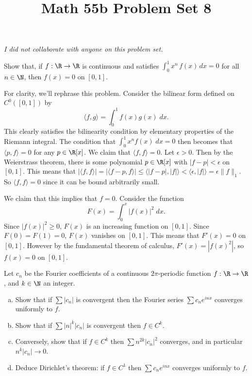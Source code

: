 \documentclass[11pt,letterpaper]{article}
\title{\textbf{Math 55b Problem Set 8}}
\begin{document}
\maketitle

\begin{center}
    \textit{I did not collaborate with anyone on this problem set.}
\end{center}
\begin{problem}
    Show that, if $f:\R\to \R$ is continuous and satisfies $\int_0^1 x^n\,f(x)\,dx=0$ for all $n\in \N$, then $f(x)=0$ on $[0,1]$. 
\end{problem}
\begin{solution}
    For clarity, we'll rephrase this problem. Consider the bilinear form defined on $C^0([0,1])$ by
    \[
        \big\langle f,g \big\rangle = \int^1_0 f(x)g(x)\;dx
    .\] 
    This clearly satisfies the bilinearity condition by elementary properties of the Riemann integral. The condition that $\int_0^1 x^nf(x)\;dx=0$ then becomes that $\big\langle p,f \big\rangle=0$ for any $p\in \R[x]$. We claim that $\big\langle f,f \big\rangle=0$. Let $\epsilon > 0$. Then by the Weierstrass theorem, there is some polynomial $p\in \R[x]$ with $|f-p|<\epsilon$ on $[0,1]$. This means that $|\big\langle f,f \big\rangle| = |\big\langle f-p, f \big\rangle| \leq \big\langle |f-p|, |f| \big\rangle < \big\langle \epsilon, |f| \big\rangle = \epsilon \|f\|_1$. So $\big\langle f,f \big\rangle=0$ since it can be bound arbitrarily small. 
    
    We claim that this implies that $f=0$. Consider the function
    \[
        F(x)=\int_0^x|f(x)|^2\;dx
    .\]  
    Since $|f(x)|^2\geq 0$, $F(x)$ is an increasing function on $[0,1]$. Since $F(0)=F(1)=0$, $F(x)$ vanishes on $[0,1]$. This means that $F'(x)=0$ on $[0,1]$. However by the fundamental theorem of calculus, $F'(x)=|f(x)^2|$, so $f(x)=0$ on $[0,1]$. 
\end{solution}

\begin{problem}
    Let $c_n$ be the Fourier coefficients of a continuous $2\pi$-periodic function $f:\R\to\R$, and $k\in\N$ an integer.
    \begin{enumerate}[(a)]
        \item Show that if $\sum |c_n|$ is convergent then the Fourier series $\sum c_n e^{inx}$ converges uniformly to $f$.
        \item Show that if $\sum |n|^k |c_n|$ is convergent then $f\in C^k$.
        \item Conversely, show that if $f\in C^k$ then $\sum n^{2k} |c_n|^2$ converges, and in particular $n^k |c_n|\to 0$.
        \item Deduce Dirichlet's theorem: if $f\in C^1$ then $\sum c_n e^{inx}$ converges uniformly to $f$.  
    \end{enumerate}
\end{problem}
\end{document}

